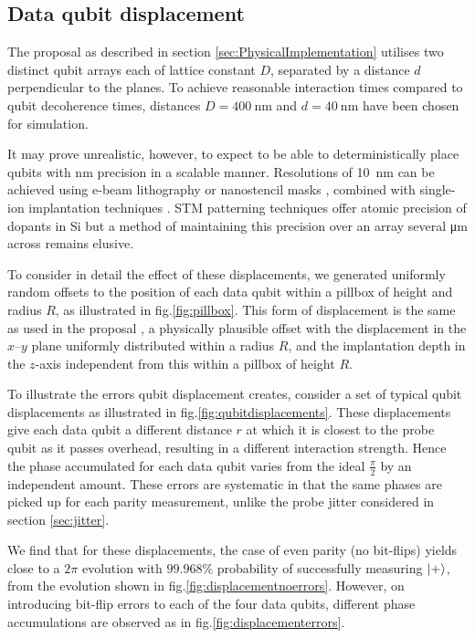 
\subsection{Data qubit displacement}
The proposal \cite{OGorman2016} as described in section \ref{sec:PhysicalImplementation} utilises two distinct qubit arrays each of lattice constant $D$, separated by a distance $d$ perpendicular to the planes. To achieve reasonable interaction times compared to qubit decoherence times, distances $D = \SI{400}{\nano\metre}$ and $d = \SI{40}{\nano\metre}$ have been chosen for simulation.

It may prove unrealistic, however, to expect to be able to deterministically place qubits with \si{\nano\metre} precision in a scalable manner. Resolutions of \SI{10}{\nano\metre} can be achieved using e-beam lithography \cite{Vieu2000a} or nanostencil masks \cite{Weis2008}, combined with single-ion implantation techniques \cite{Jamieson2005}. STM patterning techniques offer atomic precision of dopants in Si \cite{Schofield2003} but a method of maintaining this precision over an array several \si{\micro\metre} across remains elusive. 

To consider in detail the effect of these displacements, we generated uniformly random offsets to the position of each data qubit within a pillbox of height and radius $R$, as illustrated in fig.\@ \ref{fig:pillbox}. This form of displacement is the same as used in the proposal \cite{OGorman2016}, a physically plausible offset with the displacement in the $x$--$y$ plane uniformly distributed within a radius $R$, and the implantation depth in the $z$-axis independent from this within a pillbox of height $R$.

To illustrate the errors qubit displacement creates, consider a set of typical qubit displacements as illustrated in fig.\@ \ref{fig:qubitdisplacements}. These displacements give each data qubit a different distance $r$ at which it is closest to the probe qubit as it passes overhead, resulting in a different interaction strength. Hence the phase accumulated for each data qubit varies from the ideal $\tfrac{\pi}{2}$ by an independent amount. These errors are systematic in that the same phases are picked up for each parity measurement, unlike the probe jitter considered in section \ref{sec:jitter}.

We find that for these displacements, the case of even parity (no bit-flips) yields close to a $2\pi$ evolution with $99.968\%$ probability of successfully measuring $\ket{+}$, from the evolution shown in fig.\@ \ref{fig:displacementnoerrors}. However, on introducing bit-flip errors to each of the four data qubits, different phase accumulations are observed as in fig.\@ \ref{fig:displacementerrors}.


